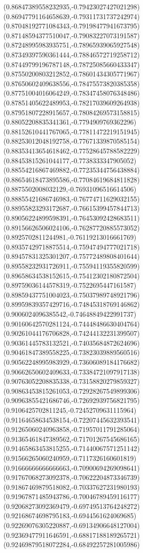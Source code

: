 \documentclass[12pt]{article}
\theoremstyle{plain}
\theoremstyle{definition}
\theoremstyle{remark}
\begin{document}
\begin{figure}
{  (0.86847389558232935,-0.79423027427021298)%
  (0.86947791164658639,-0.79311731737242974)%
  (0.87048192771084343,-0.79198477941673795)%
  (0.87148594377510047,-0.79083227073191587)%
  (0.87248995983935751,-0.78965939065927548)%
  (0.87349397590361444,-0.78846572719258712)%
  (0.87449799196787148,-0.78725085660433347)%
  (0.87550200803212852,-0.78601434305771967)%
  (0.87650602409638556,-0.78475573820385358)%
  (0.87751004016064249,-0.78347458076348486)%
  (0.87851405622489953,-0.78217039609264938)%
  (0.87951807228915657,-0.78084269573158815)%
  (0.88052208835341361,-0.7794909769362296)%
  (0.88152610441767065,-0.77811472219151945)%
  (0.88253012048192758,-0.77671339870585154)%
  (0.88353413654618462,-0.77528645788582229)%
  (0.88453815261044177,-0.7738333347905052)%
  (0.88554216867469882,-0.77235344756438884)%
  (0.88654618473895586,-0.77084619684811828)%
  (0.8875502008032129,-0.76931096516614506)%
  (0.88855421686746983,-0.76774711629032155)%
  (0.88955823293172687,-0.76615399457844713)%
  (0.89056224899598391,-0.76453092428683511)%
  (0.89156626506024106,-0.76287720885573052)%
  (0.8925702811244981,-0.76119213016661769)%
  (0.89357429718875514,-0.75947494777021718)%
  (0.89457831325301207,-0.75772489808401644)%
  (0.89558232931726911,-0.75594119355820599)%
  (0.89658634538152615,-0.75412302180872504)%
  (0.89759036144578319,-0.7522695447161587)%
  (0.89859437751004023,-0.75037989748921796)%
  (0.89959839357429716,-0.74845318769146862)%
  (0.9006024096385542,-0.74648849422991737)%
  (0.90160642570281124,-0.74448486630404764)%
  (0.90261044176706828,-0.74244132231399507)%
  (0.90361445783132521,-0.74035684872624696)%
  (0.90461847389558225,-0.73823039889560516)%
  (0.90562248995983929,-0.73606089184176682)%
  (0.90662650602409633,-0.73384721097917138)%
  (0.90763052208835338,-0.73158820279859327)%
  (0.90863453815261053,-0.72928267549899306)%
  (0.90963855421686746,-0.72692939756821795)%
  (0.9106425702811245,-0.72452709631115964)%
  (0.91164658634538154,-0.72207445632393541)%
  (0.91265060240963858,-0.71957011791285064)%
  (0.91365461847389562,-0.71701267545686165)%
  (0.91465863453815255,-0.71440067571251142)%
  (0.91566265060240959,-0.7117326160601819)%
  (0.91666666666666663,-0.70900694269098641)%
  (0.91767068273092378,-0.70622204873346739)%
  (0.91867469879518082,-0.70337627231980193)%
  (0.91967871485943786,-0.70046789459116177)%
  (0.92068273092369479,-0.69749513764248272)%
  (0.92168674698795183,-0.6944561624069685)%
  (0.92269076305220887,-0.69134906648127004)%
  (0.92369477911646591,-0.68817188189265721)%
  (0.92469879518072284,-0.68492257281005986)%
}
\end{figure}
\end{document}
